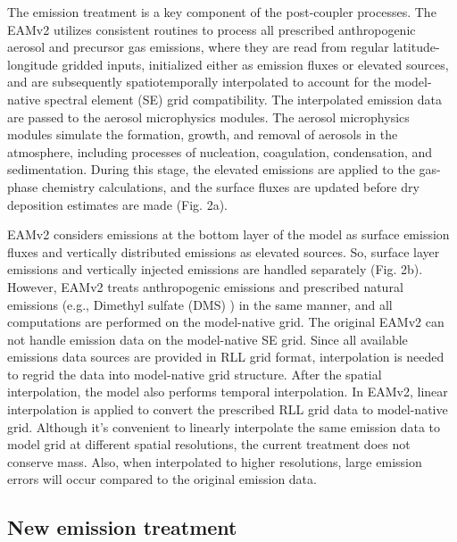 The emission treatment is a key component of the post-coupler processes. The EAMv2 utilizes consistent routines to process all prescribed anthropogenic aerosol and precursor gas emissions, where they are read from regular latitude-longitude gridded inputs, initialized either as emission fluxes or elevated sources, and are subsequently spatiotemporally interpolated to account for the model-native spectral element (SE) grid compatibility. The interpolated emission data are passed to the aerosol microphysics modules. The aerosol microphysics modules simulate the formation, growth, and removal of aerosols in the atmosphere, including processes of nucleation, coagulation, condensation, and sedimentation. During this stage, the elevated emissions are applied to the gas-phase chemistry calculations, and the surface fluxes are updated before dry deposition estimates are made (Fig. 2a).

EAMv2 considers emissions at the bottom layer of the model as surface emission fluxes and vertically distributed emissions as elevated sources. So, surface layer emissions and vertically injected emissions are handled separately (Fig. 2b). However, EAMv2 treats anthropogenic emissions and prescribed natural emissions (e.g., Dimethyl sulfate (DMS) ) in the same manner, and all computations are performed on the  model-native grid. The original EAMv2  can not handle emission data on  the model-native SE grid. Since all available emissions data sources are provided in RLL grid format, interpolation is needed to regrid the data into model-native grid structure. After the spatial interpolation, the model also performs temporal interpolation. In EAMv2, linear interpolation is applied to convert the prescribed RLL grid data to model-native grid. Although it’s convenient to linearly interpolate the same emission data to model grid at different spatial resolutions, the current treatment does not conserve mass. Also, when interpolated to higher resolutions, large emission errors will occur compared to the original emission data.

\subsection{New emission treatment}

